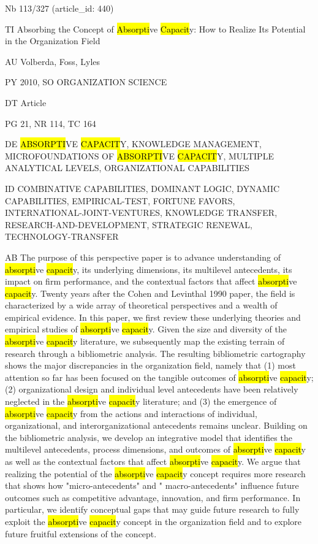 \documentclass[a4paper]{article}
\begin{document}
\vspace*{-2cm}
Nb \tabto{0cm}113/327 (article\_id: 440)\par
TI \tabto{0cm}Absorbing the Concept of \hl{Absorpti}ve \hl{Capacit}y: How to Realize Its Potential in the Organization Field\par
AU \tabto{0cm}Volberda, Foss, Lyles\par
PY \tabto{0cm}2010, SO ORGANIZATION SCIENCE\par
DT \tabto{0cm}Article\par
PG \tabto{0cm}21, NR 114, TC 164\par
DE \tabto{0cm}\hl{ABSORPTI}VE \hl{CAPACIT}Y, KNOWLEDGE MANAGEMENT, MICROFOUNDATIONS OF \hl{ABSORPTI}VE \hl{CAPACIT}Y, MULTIPLE ANALYTICAL LEVELS, ORGANIZATIONAL CAPABILITIES\par
ID \tabto{0cm}COMBINATIVE CAPABILITIES, DOMINANT LOGIC, DYNAMIC CAPABILITIES, EMPIRICAL-TEST, FORTUNE FAVORS, INTERNATIONAL-JOINT-VENTURES, KNOWLEDGE TRANSFER, RESEARCH-AND-DEVELOPMENT, STRATEGIC RENEWAL, TECHNOLOGY-TRANSFER\par
AB \tabto{0cm}The purpose of this perspective paper is to advance understanding of \hl{absorpti}ve \hl{capacit}y, its underlying dimensions, its multilevel antecedents, its impact on firm performance, and the contextual factors that affect \hl{absorpti}ve \hl{capacit}y. Twenty years after the Cohen and Levinthal 1990 paper, the field is characterized by a wide array of theoretical perspectives and a wealth of empirical evidence. In this paper, we first review these underlying theories and empirical studies of \hl{absorpti}ve \hl{capacit}y. Given the size and diversity of the \hl{absorpti}ve \hl{capacit}y literature, we subsequently map the existing terrain of research through a bibliometric analysis. The resulting bibliometric cartography shows the major discrepancies in the organization field, namely that (1) most attention so far has been focused on the tangible outcomes of \hl{absorpti}ve \hl{capacit}y; (2) organizational design and individual level antecedents have been relatively neglected in the \hl{absorpti}ve \hl{capacit}y literature; and (3) the emergence of \hl{absorpti}ve \hl{capacit}y from the actions and interactions of individual, organizational, and interorganizational antecedents remains unclear. Building on the bibliometric analysis, we develop an integrative model that identifies the multilevel antecedents, process dimensions, and outcomes of \hl{absorpti}ve \hl{capacit}y as well as the contextual factors that affect \hl{absorpti}ve \hl{capacit}y. We argue that realizing the potential of the \hl{absorpti}ve \hl{capacit}y concept requires more research that shows how "micro-antecedents" and " macro-antecedents" influence future outcomes such as competitive advantage, innovation, and firm performance. In particular, we identify conceptual gaps that may guide future research to fully exploit the \hl{absorpti}ve \hl{capacit}y concept in the organization field and to explore future fruitful extensions of the concept.\par
\clearpage
\end{document}
